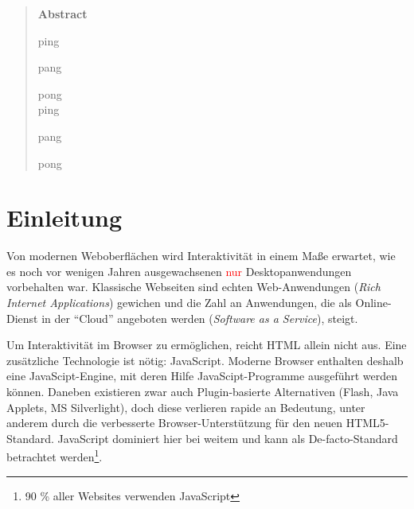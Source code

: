\documentclass[a4paper, 12pt, hidelinks, listof=totoc, listoftables=totoc, bibliography=totoc]{scrreprt}
\newcommand{\TODO}[1]{\textcolor{red}{#1}\newline}
\begin{document}


\pagestyle{empty} %


\begin{abstract}

\Large
	\textbf{Abstract}

\normalsize


ping

pang

pong \\


ping

pang

pong
\end{abstract}


\pagestyle{scrheadings} %



\tableofcontents

\newpage


\chapter{Einleitung}



Von modernen Weboberflächen wird Interaktivität in einem Maße erwartet, wie es noch vor wenigen Jahren ausgewachsenen \TODO{nur} Desktopanwendungen vorbehalten war. Klassische Webseiten sind echten Web-Anwendungen (\emph{Rich Internet Applications}) gewichen und die Zahl an Anwendungen, die als Online-Dienst in der "`Cloud"' angeboten werden (\emph{Software as a Service}), steigt.


Um Interaktivität im Browser zu ermöglichen, reicht HTML allein nicht aus. Eine zusätzliche Technologie ist nötig: JavaScript. Moderne Browser enthalten deshalb eine JavaScipt-Engine, mit deren Hilfe JavaScipt-Programme ausgeführt werden können. Daneben existieren zwar auch Plugin-basierte Alternativen (Flash, Java Applets, MS Silverlight), doch diese verlieren rapide an Bedeutung, unter anderem durch die verbesserte Browser-Unterstützung für den neuen HTML5-Standard. JavaScript dominiert hier bei weitem und kann als De-facto-Standard betrachtet werden\footnote{90 \% aller Websites verwenden JavaScript\cite{w3techs.CLI}}.
\end{document}
